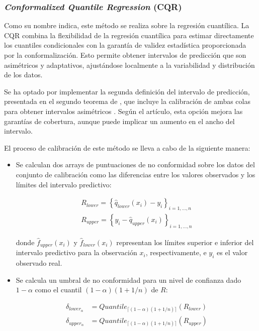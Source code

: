 \subsubsection{\textit{Conformalized Quantile Regression} (CQR)}

Como su nombre indica, este método se realiza sobre la regresión cuantílica. La CQR \cite{romano2019}
combina la flexibilidad de la regresión cuantílica para estimar directamente los cuantiles condicionales con 
la garantía de validez estadística proporcionada por la conformalización. Esto permite obtener intervalos de 
predicción que son asimétricos y adaptativos, ajustándose localmente a la variabilidad y distribución de los 
datos.

Se ha optado por implementar la segunda definición del intervalo de predicción, presentada en el segundo 
teorema de \cite{romano2019}, que incluye la calibración de ambas colas para obtener intervalos asimétricos 
\cite{linusson2014}. Según el artículo, esta opción mejora las garantías de cobertura, aunque puede implicar 
un aumento en el ancho del intervalo.

El proceso de calibración de este método se lleva a cabo de la siguiente manera: 

\begin{itemize}
    \item Se calculan dos arrays de puntuaciones de no conformidad sobre los datos del conjunto de 
    calibración como las diferencias entre los valores observados y los límites del intervalo predictivo:
    
    \begin{equation*}
    \begin{split}
        R_{lower} = \left\{ \hat{q}_{lower}(x_i) - y_i \right\}_{i=1,...,n} \\
        R_{upper} = \left\{ y_i - \hat{q}_{upper}(x_i) \right\}_{i=1,...,n} 
    \end{split}
    \end{equation*}

    donde $\hat{f}_{upper}(x_i)$ y $\hat{f}_{lower}(x_i)$ representan los límites superior e inferior del 
    intervalo predictivo para la observación $x_i$, respectivamente, e $y_i$ es el valor observado real.

    \item Se calcula un umbral de no conformidad para un nivel de confianza dado $1-\alpha$ como el 
    cuantil $(1-\alpha)(1+1/n)$ de $R$:

    \begin{equation*}
    \begin{split}
        \delta_{lower_\alpha} &= Quantile_{ \lceil  (1-\alpha) (1 + 1/n)  \rceil } ( R_{lower} ) \\
        \delta_{upper_\alpha} &= Quantile_{ \lceil  (1-\alpha) (1 + 1/n)  \rceil } ( R_{upper} ) 
    \end{split}
    \end{equation*}

\end{itemize}


